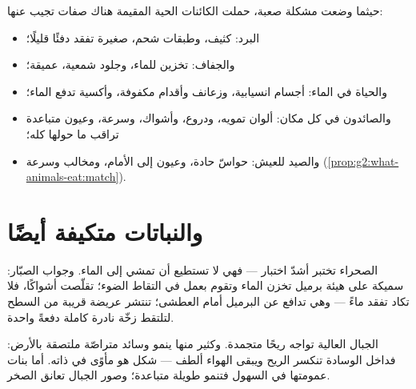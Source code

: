 \begin{proposition}\label{prop:g4:adapted-to-their-world:answers}
حيثما وضعت  مشكلة صعبة، حملت الكائنات الحية المقيمة هناك
صفات تجيب عنها:
\begin{itemize}
  \item البرد:  كثيف، وطبقات شحم،  صغيرة تفقد دفئًا قليلًا؛
  \item والجفاف: تخزين للماء، وجلود شمعية،  عميقة؛
  \item والحياة في الماء: أجسام انسيابية، وزعانف وأقدام مكفوفة،
        وأكسية تدفع الماء؛
  \item والصائدون في كل مكان: ألوان تمويه، ودروع، وأشواك، وسرعة،
        وعيون متباعدة تراقب ما حولها كله؛
  \item والصيد للعيش: حواسّ حادة، وعيون إلى الأمام، ومخالب وسرعة
        (\cref{prop:g2:what-animals-eat:match}).
\end{itemize}
\end{proposition}
\admitted

\section{والنباتات متكيفة أيضًا}

\begin{example}[الصبّار]\label{ex:g4:adapted-to-their-world:cactus}
الصحراء تختبر  أشدّ اختبار --- فهي لا تستطيع أن تمشي إلى
الماء. وجواب الصبّار:  سميكة على هيئة برميل تخزن الماء وتقوم
بعمل  في التقاط الضوء؛  تقلّصت أشواكًا، فلا تكاد تفقد
ماءً --- وهي تدافع عن البرميل أمام  العطشى؛  تنتشر
عريضة قريبة من السطح لتلتقط زخّة نادرة كاملة دفعةً واحدة.
\end{example}

\begin{example}\label{ex:g4:adapted-to-their-world:alpine}
 الجبال العالية تواجه ريحًا متجمدة. وكثير منها ينمو وسائد
متراصّة ملتصقة بالأرض: فداخل الوسادة تنكسر الريح ويبقى الهواء
ألطف --- شكل هو مأوًى في ذاته. أما بنات عمومتها في السهول فتنمو
طويلة متباعدة؛ وصور الجبال تعانق الصخر.
\end{example}

